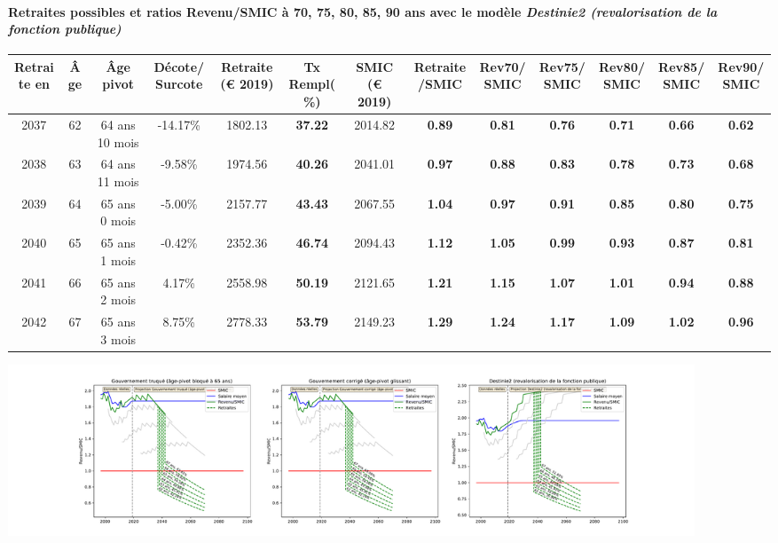 \paragraph{Retraites possibles et ratios Revenu/SMIC à 70, 75, 80, 85, 90 ans avec le modèle \emph{Destinie2 (revalorisation de la fonction publique)}}  
 
{ \scriptsize \begin{center} 
\begin{tabular}[htb]{|c|c||c|c||c|c||c||c|c|c|c|c|c|} 
\hline 
 Retraite en &  Âge &  Âge pivot &  Décote/Surcote &  Retraite (\euro{} 2019) &  Tx Rempl(\%) &  SMIC (\euro{} 2019) &  Retraite/SMIC &  Rev70/SMIC &  Rev75/SMIC &  Rev80/SMIC &  Rev85/SMIC &  Rev90/SMIC \\ 
\hline \hline 
 2037 &  62 &  64 ans 10 mois &  -14.17\% &  1802.13 &  {\bf 37.22} &  2014.82 &  {\bf {\color{red} 0.89}} &  {\bf {\color{red} 0.81}} &  {\bf {\color{red} 0.76}} &  {\bf {\color{red} 0.71}} &  {\bf {\color{red} 0.66}} &  {\bf {\color{red} 0.62}} \\ 
\hline 
 2038 &  63 &  64 ans 11 mois &  -9.58\% &  1974.56 &  {\bf 40.26} &  2041.01 &  {\bf {\color{red} 0.97}} &  {\bf {\color{red} 0.88}} &  {\bf {\color{red} 0.83}} &  {\bf {\color{red} 0.78}} &  {\bf {\color{red} 0.73}} &  {\bf {\color{red} 0.68}} \\ 
\hline 
 2039 &  64 &  65 ans 0 mois &  -5.00\% &  2157.77 &  {\bf 43.43} &  2067.55 &  {\bf 1.04} &  {\bf {\color{red} 0.97}} &  {\bf {\color{red} 0.91}} &  {\bf {\color{red} 0.85}} &  {\bf {\color{red} 0.80}} &  {\bf {\color{red} 0.75}} \\ 
\hline 
 2040 &  65 &  65 ans 1 mois &  -0.42\% &  2352.36 &  {\bf 46.74} &  2094.43 &  {\bf 1.12} &  {\bf 1.05} &  {\bf {\color{red} 0.99}} &  {\bf {\color{red} 0.93}} &  {\bf {\color{red} 0.87}} &  {\bf {\color{red} 0.81}} \\ 
\hline 
 2041 &  66 &  65 ans 2 mois &  4.17\% &  2558.98 &  {\bf 50.19} &  2121.65 &  {\bf 1.21} &  {\bf 1.15} &  {\bf 1.07} &  {\bf 1.01} &  {\bf {\color{red} 0.94}} &  {\bf {\color{red} 0.88}} \\ 
\hline 
 2042 &  67 &  65 ans 3 mois &  8.75\% &  2778.33 &  {\bf 53.79} &  2149.23 &  {\bf 1.29} &  {\bf 1.24} &  {\bf 1.17} &  {\bf 1.09} &  {\bf 1.02} &  {\bf {\color{red} 0.96}} \\ 
\hline 
\hline 
\end{tabular} 
\end{center} } 

 \begin{center}\includegraphics[width=0.9\textwidth]{fig/Infirmier_1975_22_dest_retraite.pdf}\end{center} \label{fig/Infirmier_1975_22_dest_retraite.pdf} 

